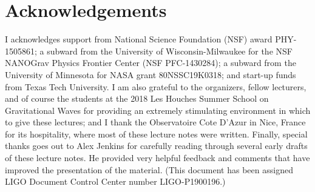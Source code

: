 \section*{Acknowledgements}
\label{s:acknowledgements}

I acknowledges support from National Science Foundation (NSF)
award PHY-1505861; a subward from the University of Wisconsin-Milwaukee
for the NSF NANOGrav Physics Frontier Center (NSF PFC-1430284); 
a subward from the University of Minnesota for NASA grant 80NSSC19K0318; 
and start-up funds from Texas Tech University.
I am also grateful to the organizers, fellow lecturers, and of course
the students at the 2018 Les Houches Summer School on Gravitational 
Waves for providing an extremely stimulating environment in which to 
give these lectures; and I thank the Observatoire Cote D'Azur in Nice, 
France for its hospitality, where most of these lecture notes were written.
Finally, special thanks goes out to  Alex Jenkins for carefully 
reading through several early drafts of these lecture notes.
He provided very helpful feedback and comments that have improved 
the presentation of the material.
(This document has been assigned LIGO Document Control Center number
LIGO-P1900196.) 
